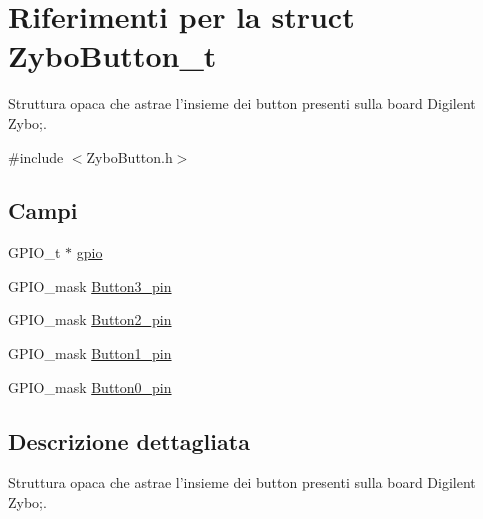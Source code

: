 \hypertarget{struct_zybo_button__t}{\section{Riferimenti per la struct Zybo\+Button\+\_\+t}
\label{struct_zybo_button__t}
}


Struttura opaca che astrae l'insieme dei button presenti sulla board Digilent Zybo;.  




{\ttfamily \#include $<$Zybo\+Button.\+h$>$}

\subsection*{Campi}
\begin{DoxyCompactItemize}
\item 
G\+P\+I\+O\+\_\+t $\ast$ \hyperlink{struct_zybo_button__t_acb3116190992a4d8d26545c103304d27}{gpio}
\item 
G\+P\+I\+O\+\_\+mask \hyperlink{struct_zybo_button__t_a0be2104e3b0077272dcbfee7dbdb14ee}{Button3\+\_\+pin}
\item 
G\+P\+I\+O\+\_\+mask \hyperlink{struct_zybo_button__t_a249726210aba837b00df4d2afc89965d}{Button2\+\_\+pin}
\item 
G\+P\+I\+O\+\_\+mask \hyperlink{struct_zybo_button__t_aa4b6f01d89a502266798176affa8f59b}{Button1\+\_\+pin}
\item 
G\+P\+I\+O\+\_\+mask \hyperlink{struct_zybo_button__t_aa079dc844a7d73e98b762cef39e9bf90}{Button0\+\_\+pin}
\end{DoxyCompactItemize}


\subsection{Descrizione dettagliata}
Struttura opaca che astrae l'insieme dei button presenti sulla board Digilent Zybo;. 

